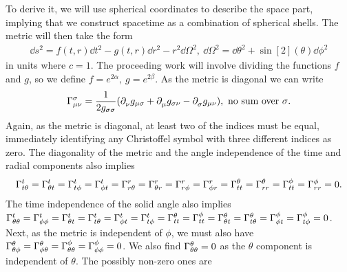 To derive it, we will use spherical coordinates to describe the space part, implying that we construct spacetime as a combination of spherical shells. The metric will then take the form
\begin{align*}
	\dd{s}^{2} = f(t, r)\dd{t}^{2} - g(t, r)\dd{r}^{2} - r^{2}\dd{\Omega}^{2},\ \dd{\Omega}^{2} = \dd{\theta}^{2} + \sin[2](\theta)\dd{\phi}^{2}
\end{align*}
in units where $c = 1$. The proceeding work will involve dividing the functions $f$ and $g$, so we define $f = e^{2\alpha},\ g = e^{2\beta}$. As the metric is diagonal we can write
\begin{align*}
	\chris{\sigma}{\mu}{\nu} = \frac{1}{2g_{\sigma\sigma}}(\del{\nu}{g_{\mu\sigma}} + \del{\mu}{g_{\sigma\nu}} - \del{\sigma}{g_{\mu\nu}}),\ \text{no sum over $\sigma$.}
\end{align*}
Again, as the metric is diagonal, at least two of the indices must be equal, immediately identifying any Christoffel symbol with three different indices as zero. The diagonality of the metric and the angle independence of the time and radial components also implies
\begin{align*}
	\chris{t}{t}{\theta} = \chris{t}{\theta}{t} = \chris{t}{t}{\phi} = \chris{t}{\phi}{t} = \chris{r}{r}{\theta} = \chris{r}{\theta}{r} = \chris{r}{r}{\phi} = \chris{r}{\phi}{r} = \chris{\theta}{t}{t} = \chris{\theta}{r}{r} = \chris{\phi}{t}{t} = \chris{\phi}{r}{r} = 0.
\end{align*}
The time independence of the solid angle also implies $\chris{t}{\theta}{\theta} = \chris{t}{\phi}{\phi} = \chris{t}{\theta}{t} = \chris{t}{t}{\theta} = \chris{t}{\phi}{t} = \chris{t}{t}{\phi} = \chris{\theta}{t}{t} = \chris{\phi}{t}{t} = \chris{\theta}{\theta}{t} = \chris{\theta}{t}{\theta} = \chris{\phi}{\phi}{t} = \chris{\phi}{t}{\phi} = 0$. Next, as the metric is independent of $\phi$, we must also have $\chris{\theta}{\theta}{\phi} =	\chris{\theta}{\phi}{\theta} = \chris{\phi}{\theta}{\theta} = \chris{\phi}{\phi}{\phi} = 0$. We also find $\chris{\theta}{\theta}{\theta} = 0$ as the $\theta$ component is independent of $\theta$. The possibly non-zero ones are
